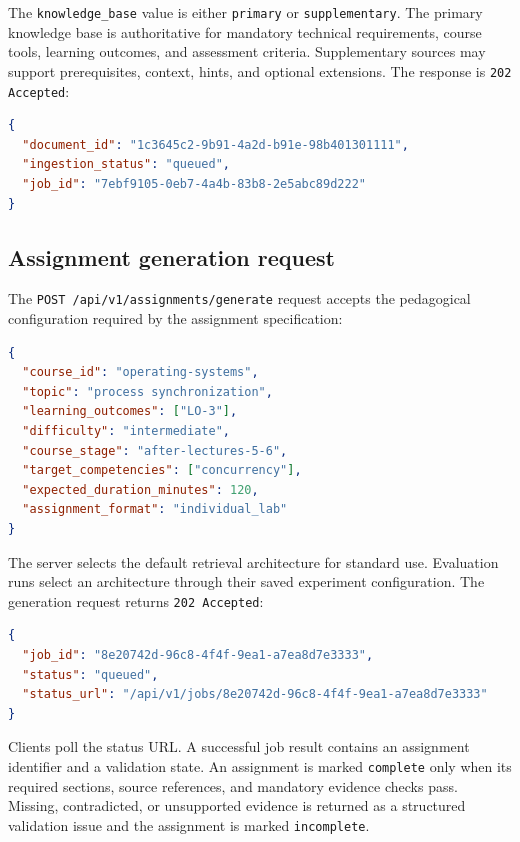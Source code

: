 \documentclass[12pt,a4paper]{article}
\begin{document}
The \texttt{knowledge\_base} value is either \texttt{primary} or
\texttt{supplementary}. The primary knowledge base is authoritative
for mandatory technical requirements, course tools, learning
outcomes, and assessment criteria. Supplementary sources may
support prerequisites, context, hints, and optional extensions.
The response is \texttt{202 Accepted}:

\begin{lstlisting}[language=json, numbers=none]
{
  "document_id": "1c3645c2-9b91-4a2d-b91e-98b401301111",
  "ingestion_status": "queued",
  "job_id": "7ebf9105-0eb7-4a4b-83b8-2e5abc89d222"
}
\end{lstlisting}

\subsection{Assignment generation request}

The \texttt{POST /api/v1/assignments/generate} request accepts the
pedagogical configuration required by the assignment specification:

\begin{lstlisting}[language=json, numbers=none]
{
  "course_id": "operating-systems",
  "topic": "process synchronization",
  "learning_outcomes": ["LO-3"],
  "difficulty": "intermediate",
  "course_stage": "after-lectures-5-6",
  "target_competencies": ["concurrency"],
  "expected_duration_minutes": 120,
  "assignment_format": "individual_lab"
}
\end{lstlisting}

The server selects the default retrieval architecture for standard
use. Evaluation runs select an architecture through their saved
experiment configuration. The generation request returns
\texttt{202 Accepted}:

\begin{lstlisting}[language=json, numbers=none]
{
  "job_id": "8e20742d-96c8-4f4f-9ea1-a7ea8d7e3333",
  "status": "queued",
  "status_url": "/api/v1/jobs/8e20742d-96c8-4f4f-9ea1-a7ea8d7e3333"
}
\end{lstlisting}

Clients poll the status URL. A successful job result contains an
assignment identifier and a validation state. An assignment is
marked \texttt{complete} only when its required
sections, source references, and mandatory evidence checks pass.
Missing, contradicted, or unsupported evidence is returned as a
structured validation issue and the assignment is marked
\texttt{incomplete}.
\end{document}
